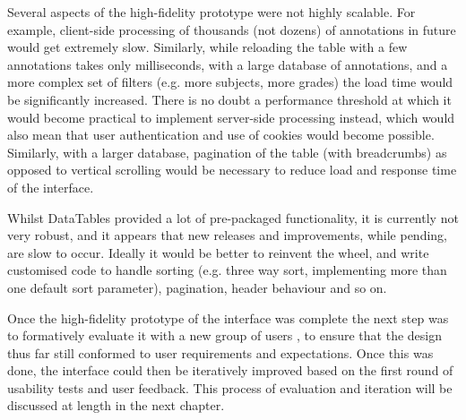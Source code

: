Several aspects of the high-fidelity prototype were not highly scalable. For example, client-side processing of thousands (not dozens) of annotations in future would get extremely slow. Similarly, while reloading the table with a few annotations takes only milliseconds, with a large database of annotations, and a more complex set of filters (e.g. more subjects, more grades) the load time would be significantly increased. There is no doubt a performance threshold at which it would become practical to implement server-side processing instead, which would also mean that user authentication and use of cookies would become possible. Similarly, with a larger database, pagination of the table (with breadcrumbs) as opposed to vertical scrolling would be necessary to reduce load and response time of the interface. 

Whilst DataTables provided a lot of pre-packaged functionality, it is currently not very robust, and it appears that new releases and improvements, while pending, are slow to occur. Ideally it would be better to reinvent the wheel, and write customised code to handle sorting (e.g. three way sort, implementing more than one default sort parameter), pagination, header behaviour and so on. 

Once the high-fidelity prototype of the interface was complete the next step was to formatively evaluate it with a new group of users \citep[p. 329]{RogersPreece}, to ensure that the design thus far still conformed to user requirements and expectations. Once this was done, the interface could then be iteratively improved based on the first round of usability tests and user feedback. This process of evaluation and iteration will be discussed at length in the next chapter. 